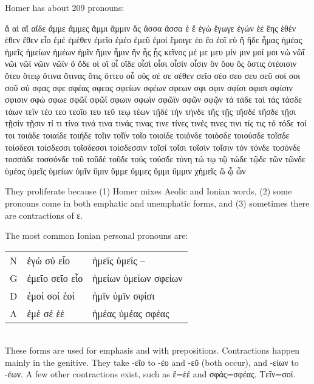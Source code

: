 \pagebreak

\begin{small}

\newcommand{\grammartablehdr}[1]{{\textcolor{gray}{\emph{#1}}}}



Homer has about 209 pronouns:

{\footnotesize 
ἅ αἱ αἵ αἵδε ἄμμε ἄμμες ἄμμι ἄμμιν ἅς ἄσσα ἅσσα ἑ ἕ ἐγώ ἔγωγε ἐγών ἑέ ἕης ἑθέν ἑθεν ἕθεν εἷο ἐμέ ἐμέθεν ἐμεῖο ἐμέο ἐμεῦ ἐμοί ἔμοιγε ἑο ἕο ἑοῖ εὑ ἥ ἥδε ἧμας ἡμέας ἡμεῖς ἡμείων ἡμέων ἡμῖν ἥμιν ἧμιν ἥν ἧς ᾗς κεῖνος μέ με μευ μίν μιν μοί μοι νώ νῶΐ νῶι νῶϊ νῶιν νῶϊν ὅ ὅδε οἱ οἵ οἷ οἵδε οἷσί οἷσι οἷσίν οἷσιν ὅν ὅου ὅς ὅστις ὁτέοισιν ὅτευ ὅτεῳ ὅτινα ὅτινας ὅτις ὅττευ οὗ οὕς σέ σε σέθεν σεῖο σέο σεο σευ σεῦ σοί σοι σοῦ σύ σφας σφε σφέας σφεας σφείων σφέων σφεων σφι σφιν σφίσι σφισι σφίσιν σφισιν σφώ σφωε σφῶΐ σφῶϊ σφωιν σφωϊν σφῶϊν σφῶν σφῷν τά τάδε ταί τάς τάσδε τάων τεΐν τέο τεο τεοῖο τευ τεῦ τεῳ τέων τῇδέ τήν τήνδε τῆς τῇς τῆσδέ τῆσδε τῇσι τῇσίν τῇσιν τί τι τίνα τινά τινα τινάς τινας τινε τίνες τινές τινες τινι τίς τις τό τόδε τοί τοι τοιάδε τοιαίδε τοιήδε τοῖιν τοῖϊν τοῖο τοιοίδε τοιόνδε τοιόσδε τοιούσδε τοῖσδε τοίσδεσι τοίσδεσσι τοῖσδεσσι τοίσδεσσιν τοῖσί τοῖσι τοῖσίν τοῖσιν τόν τόνδε τοσόνδε τοσσάδε τοσσόνδε τοῦ τοῦδέ τοῦδε τούς τούσδε τύνη τώ τῳ τῷ τώδε τῷδε τῶν τῶνδε ὑμέας ὑμεῖς ὑμείων ὑμῖν ὕμιν ὔμμε ὔμμες ὔμμι ὔμμιν χἠμεῖς ὥ ᾧ ὧν
}

They proliferate because (1) Homer mixes Aeolic and Ionian words, (2) some pronouns come in both emphatic and unemphatic forms, and
(3) sometimes there are contractions of ε.


The most common Ionian personal pronouns are:\\
%
\begin{tabular}{lll}
N & ἐγώ σύ εἷο     & ἡμεῖς ὑμεῖς -- \\
G & ἐμεῖο σεῖο εἷο & ἡμείων ὑμείων σφείων \\
D & ἐμοί σοί ἑοί   & ἡμῖν ὑμῖν σφίσι \\
A & ἐμέ σέ ἑέ      & ἡμέας ὑμέας σφέας
\end{tabular}\\
%
These forms are used for emphasis and with prepositions.
Contractions happen mainly in the genitive. They take -εῖο to -έο and -εῦ (both occur), and -είων to -έων.
A few other contractions exist, such as ἕ=ἑέ and σφάς=σφέας. Τεΐν=σοί. 


\end{small}

